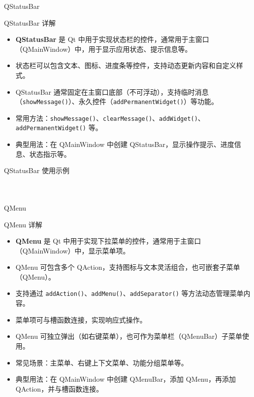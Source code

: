 \documentclass[UTF8,aspectratio=169]{beamer}
\begin{document}
\begin{frame}{QStatusBar}
    \begin{ytublock}{QStatusBar 详解}
        \begin{itemize}
            \item \textbf{QStatusBar} 是 Qt 中用于实现状态栏的控件，通常用于主窗口（QMainWindow）中，用于显示应用状态、提示信息等。
            \item 状态栏可以包含文本、图标、进度条等控件，支持动态更新内容和自定义样式。
            \item QStatusBar 通常固定在主窗口底部（不可浮动），支持临时消息（\texttt{showMessage()}）、永久控件（\texttt{addPermanentWidget()}）等功能。
            \item 常用方法：\texttt{showMessage()}、\texttt{clearMessage()}、\texttt{addWidget()}、\texttt{addPermanentWidget()} 等。
            \item 典型用法：在 QMainWindow 中创建 QStatusBar，显示操作提示、进度信息、状态指示等。
        \end{itemize}
    \end{ytublock}
\end{frame}

\begin{frame}[fragile]{QStatusBar 使用示例}
    \begin{columns}
        \begin{column}{0.48\textwidth}
            \inputminted[firstline=1,lastline=19]{cpp}{code/qt_statusbar_example.cpp}
        \end{column}
        \begin{column}{0.48\textwidth}
            \inputminted[firstline=20,lastline=35]{cpp}{code/qt_statusbar_example.cpp}
        \end{column}
    \end{columns}
\end{frame}

\begin{frame}{QMenu}
    \begin{ytublock}{QMenu 详解}
        \begin{itemize}
            \item \textbf{QMenu} 是 Qt 中用于实现下拉菜单的控件，通常用于主窗口（QMainWindow）中，显示菜单项。
            \item QMenu 可包含多个 QAction，支持图标与文本灵活组合，也可嵌套子菜单（QMenu）。
            \item 支持通过 \texttt{addAction()}、\texttt{addMenu()}、\texttt{addSeparator()} 等方法动态管理菜单内容。
            \item 菜单项可与槽函数连接，实现响应式操作。
            \item QMenu 可独立弹出（如右键菜单），也可作为菜单栏（QMenuBar）子菜单使用。
            \item 常见场景：主菜单、右键上下文菜单、功能分组菜单等。
            \item 典型用法：在 QMainWindow 中创建 QMenuBar，添加 QMenu，再添加 QAction，并与槽函数连接。
        \end{itemize}
    \end{ytublock}
\end{frame}
\end{document}
